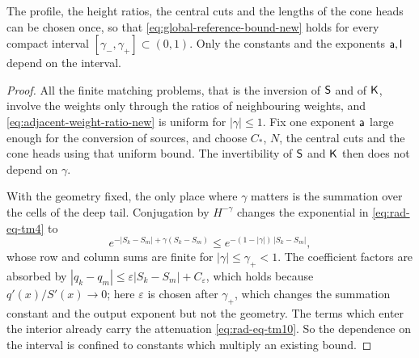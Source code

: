 \begin{lemma}
\label{lem:radial-uniform-exponents}
The profile, the height ratios, the central cuts and the lengths of
the cone heads can be chosen once, so that
\eqref{eq:global-reference-bound-new} holds for every compact interval
$[\gamma_-,\gamma_+]\subset(0,1)$. Only the constants and the
exponents $\mathsf a,\mathsf l$ depend on the interval.
\end{lemma}

\begin{proof}
All the finite matching problems, that is the inversion of $\mathsf S$ and
of $\mathsf K$, involve the weights only through the ratios of neighbouring
weights, and \eqref{eq:adjacent-weight-ratio-new} is uniform for
$|\gamma|\le1$. Fix one exponent $\mathsf a$ large enough for the
conversion of sources, and choose $C_*$, $N$, the central cuts and the
cone heads using that uniform bound. The invertibility of $\mathsf S$ and
$\mathsf K$ then does not depend on $\gamma$.

With the geometry fixed, the only place where $\gamma$ matters is the
summation over the cells of the deep tail. Conjugation by
$H^{-\gamma}$ changes the exponential in \eqref{eq:rad-eq-tm4} to
\[
 e^{-|S_k-S_m|+\gamma(S_k-S_m)}\le e^{-(1-|\gamma|)\,|S_k-S_m|},
\]
whose row and column sums are finite for $|\gamma|\le\gamma_+<1$. The
coefficient factors are absorbed by
$|q_k-q_m|\le\varepsilon|S_k-S_m|+C_\varepsilon$, which holds because
$q'(x)/S'(x)\to0$; here $\varepsilon$ is chosen after $\gamma_+$,
which changes the summation constant and the output exponent but not
the geometry. The terms which enter the interior already carry the
attenuation \eqref{eq:rad-eq-tm10}. So the dependence on the interval
is confined to constants which multiply an existing bound.
\end{proof}

